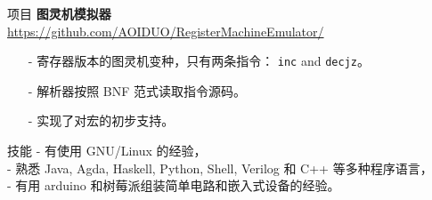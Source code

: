 \documentclass{resume} %
\newcommand{\itemsepval}{-6pt}
\newcommand{\code}{\texttt}
\begin{document}
\begin{rSection}{项目}
    \textbf{图灵机模拟器} \hfill \\ 
    \url{https://github.com/AOIDUO/RegisterMachineEmulator/} \hfill \par
    \begin{itemize}
        \itemsep \itemsepval {} 
        
        \item[-] 寄存器版本的图灵机变种，只有两条指令： \code{inc} and \code{decjz}。
        \item[-] 解析器按照 BNF 范式读取指令源码。 
        \item[-] 实现了对宏的初步支持。
    \end{itemize}


\end{rSection} 

\begin{rSection}{技能}
    - 有使用 GNU/Linux 的经验，    \\
    - 熟悉 Java, Agda, Haskell, Python, Shell, Verilog 和 C++ 等多种程序语言， \\
    - 有用 arduino 和树莓派组装简单电路和嵌入式设备的经验。

\end{rSection} 
\end{document}
